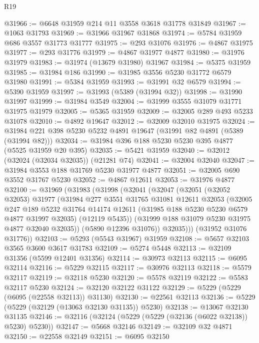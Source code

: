 \begin{lexlean}{R19}
\begin{coremodule}
@31966 := @6648 @31959 @214 @11 @3558 @3618 @31778 @31849
@31967 := @1063 @31793
@31969 := @31966 @31967 @31868
@31974 := @5784 @31959 @686 @3557 @31773 @31777
@31975 := @293 @31076
@31976 := @4867 @31975
@31977 := @293 @31776
@31979 := @4867 @31977 @4877
@31980 := @31976 @31979
@31983 := @31974 (@13679 @31980) @31967
@31984 := @5375 @31959
@31985 := @31984 @186
@31990 := @31985 @3556 @5230 @31772 @6579 @31980
@31991 := @5384 @31959
@31993 := @31991 @32 @6579
@31994 := @5390 @31959
@31997 := @31993 (@5389 (@31994 @32))
@31998 := @31990 @31997
@31999 := @31984 @3549
@32004 := @31999 @3555 @31079 @31771 @31975 @31979
@32005 := @5365 @31959
@32009 := @32005 @289 @493 @5233 @31078
@32010 := @4892 @19647
@32012 := @32009 @32010 @31975
@32024 := @31984 @221 @398 @5230 @5232 @4891 @19647 (@31991 @82 @4891 (@5389 (@31994 @82)))
@32034 := @31984 @396 @188 @5230 @5230 @395 @4877 (@5525 @31959 @20 @395)
@32035 := @5421 @31959
@32040 := @32012 (@32024 (@32034 @32035)) (@21281 @74)
@32041 := @32004 @32040
@32047 := @31984 @3553 @188 @31769 @5230 @31977 @4877
@32051 := @32005 @690 @3552 @31767 @5230
@32052 := @4867 @12611
@32053 := @31976 @4877
@32100 := @31969
    (@31983
      (@31998
        (@32041
          (@32047
            (@32051
              (@32052 @32053)
              @31977
              (@31984
                @277
                @3551
                @31765
                @31081
                @12611
                @32053
                (@32005
                  @247
                  @189
                  @5232
                  @31764
                  @14174
                  @12611
                  (@31985 @188 @5230 @5230 @6579 @4877 @31997 @32035)
                  (@12119 @5435))
                (@31999 @188 @31079 @5230 @31975 @4877 @32040 @32035))
              (@5890 @12396 @31076))
            @32035)))
      (@31952 @31076 @31776))
@32103 := @5293 (@5543 @31967) @31959
@32108 := @5657 @32103 @3565 @3600 @3617 @31783
@32109 := @5274 @5448
@32113 := @32109 @31356 (@5599 @12401 @31356)
@32114 := @30973 @32113
@32115 := @6095 @32114
@32116 := @5229 @32115
@32117 := @30976 @32113
@32118 := @5579 @32117
@32119 := @32118 @5230
@32120 := @5578 @32119
@32122 := @5583 @32117 @5230
@32124 := @32120 @32122 @31122
@32129 := @5229 (@5229 (@6095 (@22558 @32113)) @31130)
@32130 := @22561 @32113
@32136 := @5229 (@5229 (@32129 (@13063 @32130 @31135)) @5230)
@32138 := @13067 @32130 @31135
@32146 := @32116 (@32124 (@5229 (@5229 (@32136 (@6022 @32138)) @5230) @5230))
@32147 := @5668 @32146
@32149 := @32109 @32 @4871
@32150 := @22558 @32149
@32151 := @6095 @32150

\end{coremodule}
\end{lexlean}

